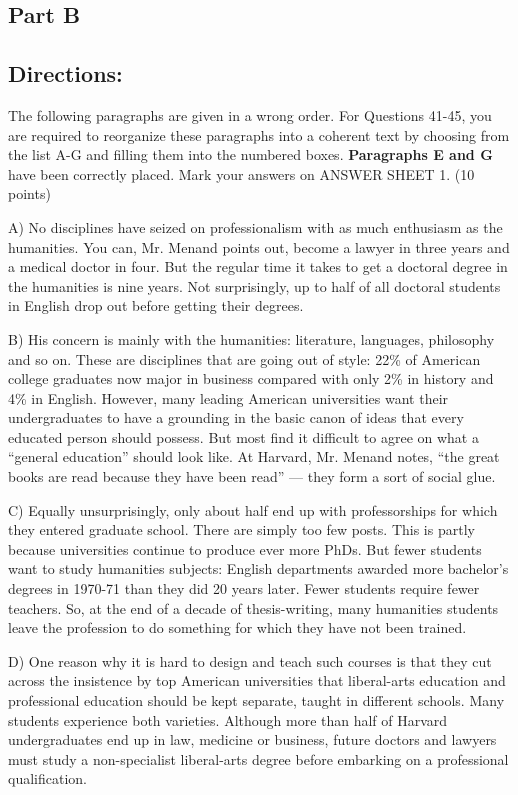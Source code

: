 \documentclass[UTF8,11pt]{ctexart}
\begin{document}
\subsection*{\textbf{Part B}}


\subsection*{\textbf{Directions:}}


The following paragraphs are given in a wrong order. For Questions 41-45, you are required to reorganize these paragraphs into a coherent text by choosing from the list A-G and filling them into the numbered boxes. \textbf{Paragraphs E and G} have been correctly placed. Mark your answers on ANSWER SHEET 1. (10 points)


A) No disciplines have seized on professionalism with as much enthusiasm as the humanities. You can, Mr. Menand points out, become a lawyer in three years and a medical doctor in four. But the regular time it takes to get a doctoral degree in the humanities is nine years. Not surprisingly, up to half of all doctoral students in English drop out before getting their degrees.


B) His concern is mainly with the humanities: literature, languages, philosophy and so on. These are disciplines that are going out of style: 22\% of American college graduates now major in business compared with only 2\% in history and 4\% in English. However, many leading American universities want their undergraduates to have a grounding in the basic canon of ideas that every educated person should possess. But most find it difficult to agree on what a “general education” should look like. At Harvard, Mr. Menand notes, “the great books are read because they have been read” — they form a sort of social glue.


C) Equally unsurprisingly, only about half end up with professorships for which they entered graduate school. There are simply too few posts. This is partly because universities continue to produce ever more PhDs. But fewer students want to study humanities subjects: English departments awarded more bachelor's degrees in 1970-71 than they did 20 years later. Fewer students require fewer teachers. So, at the end of a decade of thesis-writing, many humanities students leave the profession to do something for which they have not been trained.


D) One reason why it is hard to design and teach such courses is that they cut across the insistence by top American universities that liberal-arts education and professional education should be kept separate, taught in different schools. Many students experience both varieties. Although more than half of Harvard undergraduates end up in law, medicine or business, future doctors and lawyers must study a non-specialist liberal-arts degree before embarking on a professional qualification.
\end{document}
